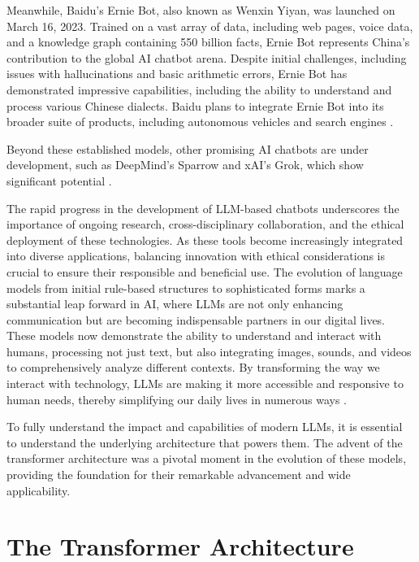 Meanwhile, Baidu’s Ernie Bot, also known as Wenxin Yiyan, was launched on March 16, 2023. Trained on a vast array of data, including web pages, voice data, and a knowledge graph containing 550 billion facts, Ernie Bot represents China’s contribution to the global AI chatbot arena. Despite initial challenges, including issues with hallucinations and basic arithmetic errors, Ernie Bot has demonstrated impressive capabilities, including the ability to understand and process various Chinese dialects. Baidu plans to integrate Ernie Bot into its broader suite of products, including autonomous vehicles and search engines \cite{motlagh2023impact, yang2023baidu}.

Beyond these established models, other promising AI chatbots are under development, such as DeepMind’s Sparrow and xAI’s Grok, which show significant potential \cite{rodriguez2023sparrow, wikipedia2024grok}.

The rapid progress in the development of LLM-based chatbots underscores the importance of ongoing research, cross-disciplinary collaboration, and the ethical deployment of these technologies. As these tools become increasingly integrated into diverse applications, balancing innovation with ethical considerations is crucial to ensure their responsible and beneficial use. The evolution of language models from initial rule-based structures to sophisticated forms marks a substantial leap forward in AI, where LLMs are not only enhancing communication but are becoming indispensable partners in our digital lives. These models now demonstrate the ability to understand and interact with humans, processing not just text, but also integrating images, sounds, and videos to comprehensively analyze different contexts. By transforming the way we interact with technology, LLMs are making it more accessible and responsive to human needs, thereby simplifying our daily lives in numerous ways \cite{researchgraph2024}.

To fully understand the impact and capabilities of modern LLMs, it is essential to understand the underlying architecture that powers them. The advent of the transformer architecture was a pivotal moment in the evolution of these models, providing the foundation for their remarkable advancement and wide applicability.

\section{The Transformer Architecture}

